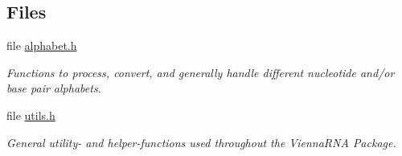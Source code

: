 \subsection*{Files}
\begin{DoxyCompactItemize}
\item 
file \hyperlink{alphabet_8h}{alphabet.\+h}
\begin{DoxyCompactList}\small\item\em Functions to process, convert, and generally handle different nucleotide and/or base pair alphabets. \end{DoxyCompactList}\item 
file \hyperlink{utils_8h}{utils.\+h}
\begin{DoxyCompactList}\small\item\em General utility-\/ and helper-\/functions used throughout the {\itshape Vienna\+R\+NA} {\itshape Package}. \end{DoxyCompactList}\end{DoxyCompactItemize}
